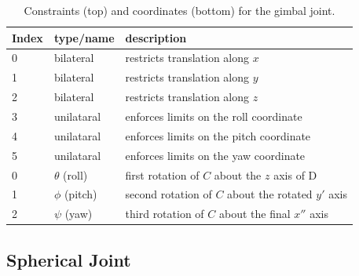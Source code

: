 \begin{table}[h]
\centering
\begin{tabular}{|l|l|l|}
\hline
Index & type/name & description \\
\hline
0 & bilateral & restricts translation along $x$ \\
1 & bilateral & restricts translation along $y$ \\
2 & bilateral & restricts translation along $z$ \\
3 & unilataral & enforces limits on the roll coordinate \\
4 & unilataral & enforces limits on the pitch coordinate \\
5 & unilataral & enforces limits on the yaw coordinate \\
\hline
\hline
0 & $\theta$ (roll) & first rotation of $C$ about the $z$ axis of D \\
1 & $\phi$ (pitch) & second rotation of $C$ about the rotated $y'$ axis \\
2 & $\psi$ (yaw) & third rotation of $C$ about the final $x''$ axis \\
\hline
\end{tabular}
\caption{Constraints (top) and coordinates (bottom) for the gimbal joint.}
\label{GimbalConstraints:tbl}
\end{table}

\subsection{Spherical Joint}

